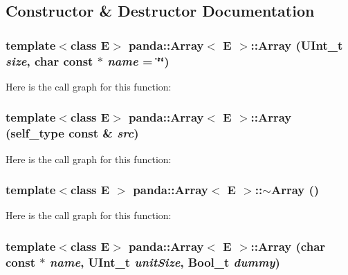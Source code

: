 \subsection{Constructor \& Destructor Documentation}
\hypertarget{classpanda_1_1Array_a05daeb194a5d5580d7c843374c45d610}{
\subsubsection[{Array}]{\setlength{\rightskip}{0pt plus 5cm}template$<$class E$>$ {\bf panda::Array}$<$ E $>$::{\bf Array} (UInt\_\-t {\em size}, \/  char const $\ast$ {\em name} = {\ttfamily \char`\"{}\char`\"{}})}}
\label{classpanda_1_1Array_a05daeb194a5d5580d7c843374c45d610}


Here is the call graph for this function:\hypertarget{classpanda_1_1Array_abe9578422f7f20d94532ad581404178a}{
\subsubsection[{Array}]{\setlength{\rightskip}{0pt plus 5cm}template$<$class E$>$ {\bf panda::Array}$<$ E $>$::{\bf Array} ({\bf self\_\-type} const \& {\em src})}}
\label{classpanda_1_1Array_abe9578422f7f20d94532ad581404178a}


Here is the call graph for this function:\hypertarget{classpanda_1_1Array_a98143dcae933f0bc7604aea8fb6c6439}{
\subsubsection[{$\sim$Array}]{\setlength{\rightskip}{0pt plus 5cm}template$<$class E $>$ {\bf panda::Array}$<$ E $>$::$\sim${\bf Array} ()}}
\label{classpanda_1_1Array_a98143dcae933f0bc7604aea8fb6c6439}


Here is the call graph for this function:\hypertarget{classpanda_1_1Array_ae1388498ce5be69e85a07dffc4f21547}{
\subsubsection[{Array}]{\setlength{\rightskip}{0pt plus 5cm}template$<$class E$>$ {\bf panda::Array}$<$ E $>$::{\bf Array} (char const $\ast$ {\em name}, \/  UInt\_\-t {\em unitSize}, \/  Bool\_\-t {\em dummy})}}
\label{classpanda_1_1Array_ae1388498ce5be69e85a07dffc4f21547}


